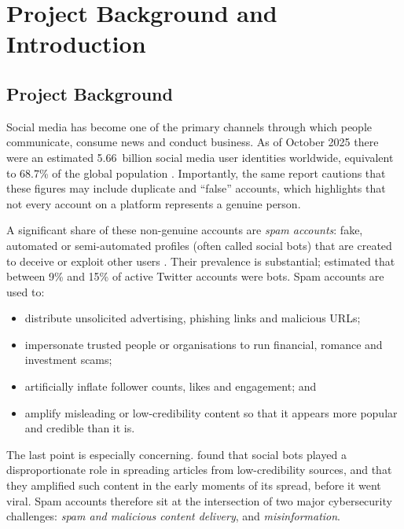 \section{Project Background and Introduction}\label{sec:introduction}

\subsection{Project Background}\label{sec:background}

Social media has become one of the primary channels through which people communicate, consume news and conduct business. As of October 2025 there were an estimated 5.66~billion social media user identities worldwide, equivalent to 68.7\% of the global population \parencite{kemp2025digital2026}. Importantly, the same report cautions that these figures may include duplicate and \enquote{false} accounts, which highlights that not every account on a platform represents a genuine person.

A significant share of these non-genuine accounts are \emph{spam accounts}: fake, automated or semi-automated profiles (often called social bots) that are created to deceive or exploit other users \parencite{ferrara2016rise}. Their prevalence is substantial; \textcite{varol2017online} estimated that between 9\% and 15\% of active Twitter accounts were bots. Spam accounts are used to:

\begin{itemize}[nosep]
  \item distribute unsolicited advertising, phishing links and malicious URLs;
  \item impersonate trusted people or organisations to run financial, romance and investment scams;
  \item artificially inflate follower counts, likes and engagement; and
  \item amplify misleading or low-credibility content so that it appears more popular and credible than it is.
\end{itemize}

The last point is especially concerning. \textcite{shao2018spread} found that social bots played a disproportionate role in spreading articles from low-credibility sources, and that they amplified such content in the early moments of its spread, before it went viral. Spam accounts therefore sit at the intersection of two major cybersecurity challenges: \emph{spam and malicious content delivery}, and \emph{misinformation}.

